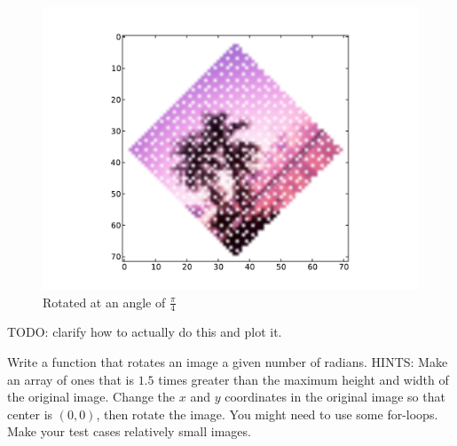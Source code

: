 \begin{figure}[H]
\includegraphics[scale = .5]{rotateimg.pdf}
\caption{Rotated at an angle of $\frac{\pi}{4}$}
\end{figure}

TODO: clarify how to actually do this and plot it.

\begin{problem}
Write a function that rotates an image a given number of radians.
HINTS: Make an array of ones that is $1.5$ times greater than the maximum height and width of the original image.
Change the $x$ and $y$ coordinates in the original image so that center is $(0,0)$, then rotate the image.
You might need to use some for-loops.
Make your test cases relatively small images.
\end{problem}


